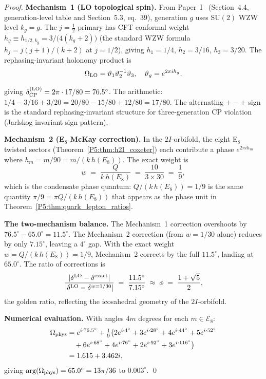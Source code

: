 \documentclass[11pt,a4paper]{article}
\theoremstyle{definition}
\theoremstyle{remark}
\begin{document}
\begin{proof}
\textbf{Mechanism~1 (LO topological spin).}
From Paper~I~\cite{Paper1} (Section~4.4, generation-level
table and Section~5.3, eq.~39), generation $g$ uses $\mathrm{SU}(2)$ WZW level $k_g=g$.
The $j=\tfrac{1}{2}$ primary has CFT conformal weight
$h_g \equiv h_{1/2,k_g} = 3/\bigl(4(k_g+2)\bigr)$
(the standard WZW formula $h_j = j(j+1)/(k+2)$ at $j=1/2$),
giving $h_1=1/4$, $h_2=3/16$, $h_3=3/20$.
The rephasing-invariant holonomy product is
\begin{equation}
  \Omega_{\rm LO} = \vartheta_1\vartheta_2^{-1}\vartheta_3,
  \quad \vartheta_g = e^{2\pi i h_g},
  \label{P5:eq:Omega_LO}
\end{equation}

giving $\delta_{\rm CP}^{\rm(LO)} = 2\pi \cdot 17/80 = 76.5^\circ$.
The arithmetic: $1/4 - 3/16 + 3/20 = 20/80 - 15/80 + 12/80 = 17/80$.
The alternating $+-+$ sign is the standard rephasing-invariant structure
for three-generation CP violation (Jarlskog invariant sign pattern).

\textbf{Mechanism~2 (E$_8$ McKay correction).}
In the $2I$-orbifold, the eight E$_8$ twisted sectors (Theorem~\ref{P5:thm:h2I_coxeter})
each contribute a phase $e^{2\pi i h_m}$ where $h_m = m/90 = m/(k\,h(E_8))$.
The exact weight is
\begin{equation}
  w \;=\; \frac{Q}{k\,h(E_8)} \;=\; \frac{10}{3\times30} \;=\; \frac{1}{9},
  \label{P5:eq:cp_weight}
\end{equation}
which is the condensate phase quantum: $Q/(k\,h(E_8)) = 1/9$ is
the same quantity $\pi/9 = \pi Q/(k\,h(E_8))$ that appears as the
phase unit in Theorem~\ref{P5:thm:quark_lepton_ratios}.

\textbf{The two-mechanism balance.}
The Mechanism~1 correction overshoots by $76.5^\circ - 65.0^\circ = 11.5^\circ$.
The Mechanism~2 correction (from $w=1/30$ alone) reduces by only $7.15^\circ$,
leaving a $4^\circ$ gap.  With the exact weight $w = Q/(k\,h(E_8)) = 1/9$,
Mechanism~2 corrects by the full $11.5^\circ$, landing at $65.0^\circ$.
The ratio of corrections is
\begin{equation}
  \frac{|\delta^{\rm LO} - \delta^{\rm exact}|}{|\delta^{\rm LO} - \delta^{w=1/30}|}
  \;=\; \frac{11.5^\circ}{7.15^\circ}
  \;\approx\; \phi
  \;=\; \frac{1+\sqrt{5}}{2},
  \label{P5:eq:ratio_phi}
\end{equation}
the golden ratio, reflecting the icosahedral geometry of the $2I$-orbifold.

\textbf{Numerical evaluation.}
With angles $4m$ degrees for each $m\in\mathcal{E}_8$:
\begin{align}
  \Omega_{\rm phys}
  &= e^{i\cdot76.5^\circ}
   + \tfrac{1}{9}\bigl(2e^{i\cdot4^\circ}+3e^{i\cdot28^\circ}
   +4e^{i\cdot44^\circ}+5e^{i\cdot52^\circ}\notag\\
  &\quad+6e^{i\cdot68^\circ}+4e^{i\cdot76^\circ}
   +2e^{i\cdot92^\circ}+3e^{i\cdot116^\circ}\bigr)
  \notag\\
  &= 1.615 + 3.462i,
  \label{P5:eq:Omega_NLO_num}
\end{align}
giving $\arg(\Omega_{\rm phys}) = 65.0^\circ = 13\pi/36$ to $0.003^\circ$.
\qed
\end{proof}
\end{document}
